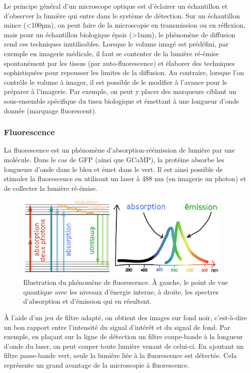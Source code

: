 Le principe général d'un microscope optique est d'éclairer un échantillon et d'observer la lumière qui entre dans le système de détection. Sur un échantillon mince (<100µm), on peut faire de la microscopie en transmission ou en réflexion, mais pour un échantillon biologique épais (>1mm), le phénomène de diffusion rend ces techniques inutilisables. Lorsque le volume imagé est prédéfini, par exemple en imagerie médicale, il faut se contenter de la lumière ré-émise spontanément par les tissus (par auto-fluorescence) et élaborer des techniques sophistiquées pour repousser les limites de la diffusion. Au contraire, lorsque l'on contrôle le volume à imager, il est possible de le modifier à l'avance pour le préparer à l'imagerie. Par exemple, on peut y placer des marqueurs ciblant un sous-ensemble spécifique du tissu biologique et émettant à une longueur d'onde donnée (marquage fluorescent).

\subsubsection{Fluorescence}

La fluorescence est un phénomène d’absorption-réémission de lumière par une molécule. Dans le cas de GFP (ainsi que GCaMP), la protéine absorbe les longueurs d'onde dans le bleu et émet dans le vert. Il est ainsi possible de stimuler la fluorescence en utilisant un laser à 488 nm (en imagerie un photon) et de collecter la lumière ré-émise. 

\begin{figure}
\centering
\includegraphics[width=0.95\textwidth]{./files/fluo_couleur.svg.png}
\caption{Illustration du phénomène de fluorescence. À gauche, le point de vue quantique avec les niveaux d'énergie interne, à droite, les spectres d’absorption et d'émission qui en résultent.}
\end{figure}

À l'aide d'un jeu de filtre adapté, on obtient des images sur fond noir, c'est-à-dire un bon rapport entre l'intensité du signal d'intérêt et du signal de fond. Par exemple, en plaçant sur la ligne de détection un filtre coupe-bande à la longueur d'onde du laser, on peut couper toute lumière venant de celui-ci. En ajoutant un filtre passe-bande vert, seule la lumière liée à la fluorescence est détectée. Cela représente un grand avantage de la microscopie à fluorescence.

